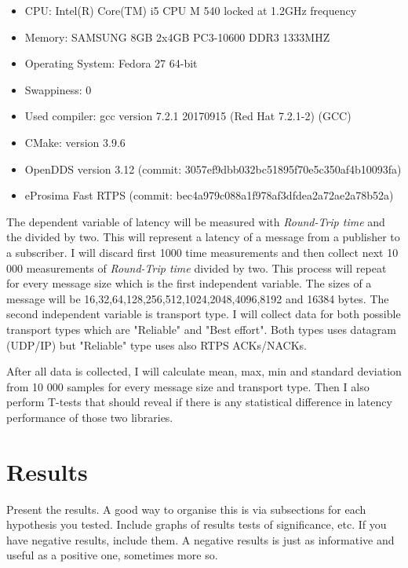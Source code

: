 \documentclass{csfourzero}
\begin{document}
\begin{itemize}
	\item CPU: Intel(R) Core(TM) i5 CPU M 540 locked at 1.2GHz frequency
	\item Memory: SAMSUNG 8GB 2x4GB PC3-10600 DDR3 1333MHZ
	\item Operating System: Fedora 27 64-bit
	\item Swappiness: 0
	\item Used compiler: gcc version 7.2.1 20170915 (Red Hat 7.2.1-2) (GCC)
	\item CMake: version 3.9.6
	\item OpenDDS version 3.12 (commit: 3057ef9dbb032bc51895f70e5c350af4b10093fa) 
	\item eProsima Fast RTPS (commit: bec4a979c088a1f978af3dfdea2a72ae2a78b52a)
\end{itemize}

The dependent variable of latency will be measured with \textit{Round-Trip time} and the divided by two. This will represent a latency of a message from a publisher to a subscriber. I will discard first 1000 time measurements and then collect next 10 000 measurements of \textit{Round-Trip time} divided by two. This process will repeat for every message size which is the first independent variable. The sizes of a message will be 16,32,64,128,256,512,1024,2048,4096,8192 and 16384 bytes. The second independent variable is transport type. I will collect data for both possible transport types which are "Reliable" and "Best effort". Both types uses datagram (UDP/IP) but "Reliable" type uses also RTPS ACKs/NACKs.

After all data is collected, I will calculate mean, max, min and standard deviation from 10 000 samples for every message size and transport type. Then I also perform T-tests that should reveal if there is any statistical difference in latency performance of those two libraries.

\section{Results}
\label{sec:results}

Present the results. A good way to organise this is via subsections
for each hypothesis you tested. Include graphs of results
 tests of significance, etc. If you have
negative results, include them. A negative results is just as
informative and useful as a positive one, sometimes more so.
\end{document}
